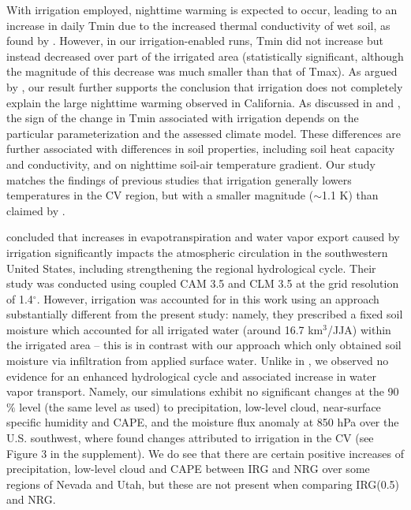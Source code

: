 \documentclass[draft,ms]{agutex}   %
\begin{document}
\begin{article}
With irrigation employed, nighttime warming is expected to occur, leading to an increase in daily Tmin due to the increased thermal conductivity of wet soil, as found by \cite{kanamaru2008model}. However, in our irrigation-enabled runs, Tmin did not increase but instead decreased over part of the irrigated area (statistically significant, although the magnitude of this decrease was much smaller than that of Tmax). As argued by \cite{bonfils2007empirical}, our result further supports the conclusion that irrigation does not completely explain the large nighttime warming observed in California. As discussed in \cite{kueppers2008seasonal} and \cite{kanamaru2008model}, the sign of the change in Tmin associated with irrigation depends on the particular parameterization and the assessed climate model.  These differences are further associated with differences in soil properties, including soil heat capacity and conductivity, and on nighttime soil-air temperature gradient. Our study matches the findings of previous studies that irrigation generally lowers temperatures in the CV region, but with a smaller magnitude ($\sim$1.1 K) than claimed by \citet{lobell2006biogeophysical}. 


\cite{lo2013irrigation} concluded that increases in evapotranspiration and water vapor export caused by irrigation significantly impacts the atmospheric circulation in the southwestern United States, including strengthening the regional hydrological cycle.  Their study was conducted using coupled CAM 3.5 and CLM 3.5 at the grid resolution of 1.4$^\circ$. However, irrigation was accounted for in this work using an approach substantially different from the present study: namely, they prescribed a fixed soil moisture which accounted for all irrigated water (around 16.7 km$^3$/JJA) within the irrigated area -- this is in contrast with our approach which only obtained soil moisture via infiltration from applied surface water.  Unlike in \cite{lo2013irrigation}, we observed no evidence for an enhanced hydrological cycle and associated increase in water vapor transport. Namely, our simulations exhibit no significant changes at the 90$\%$ level (the same level as \cite{lo2013irrigation} used) to precipitation, low-level cloud, near-surface specific humidity and CAPE, and the moisture flux anomaly at 850 hPa over the U.S. southwest, where \cite{lo2013irrigation} found changes attributed to irrigation in the CV (see Figure 3 in the supplement). We do see that there are certain positive increases of precipitation, low-level cloud and CAPE between IRG and NRG over some regions of Nevada and Utah, but these are not present when comparing IRG(0.5) and NRG.



\end{article}
\end{document}
